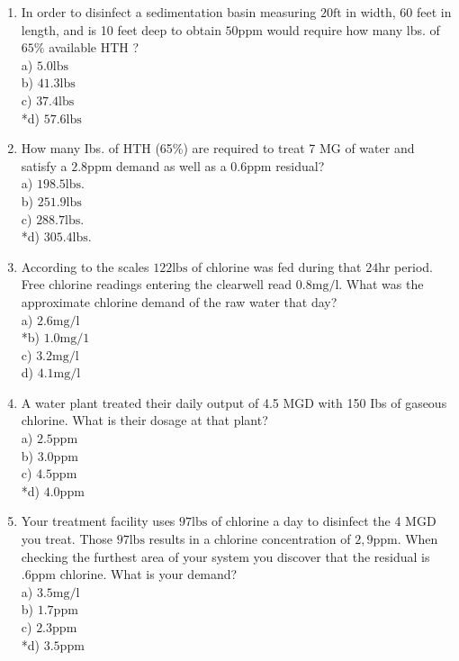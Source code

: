\documentclass{article}
\begin{document}
\begin{enumerate}

    \item In order to disinfect a sedimentation basin measuring $20 \mathrm{ft}$ in width, 60 feet in length, and is 10 feet deep to obtain $50 \mathrm{ppm}$ would require how many lbs. of $65 \%$ available $\mathrm{HTH}$ ?\\
a) $5.0 \mathrm{lbs}$\\
b) $41.3 \mathrm{lbs}$\\
c) $37.4 \mathrm{lbs}$\\
*d) $57.6 \mathrm{lbs}$\\

  \item How many Ibs. of HTH (65\%) are required to treat 7 MG of water and satisfy a $2.8 \mathrm{ppm}$ demand as well as a $0.6 \mathrm{ppm}$ residual?\\
a) $198.5 \mathrm{lbs}$.\\
b) $251.9 \mathrm{lbs}$\\
c) $288.7 \mathrm{lbs}$.\\
*d) $305.4 \mathrm{lbs}$.\\



  \item According to the scales $122 \mathrm{lbs}$ of chlorine was fed during that $24 \mathrm{hr}$ period. Free chlorine readings entering the clearwell read $0.8 \mathrm{mg} / \mathrm{l}$. What was the approximate chlorine demand of the raw water that day?\\
a) $2.6 \mathrm{mg} / \mathrm{l}$\\
*b) $1.0 \mathrm{mg} / 1$\\
c) $3.2 \mathrm{mg} / \mathrm{l}$\\
d) $4.1 \mathrm{mg} / \mathrm{l}$\\

    \item A water plant treated their daily output of 4.5 MGD with 150 Ibs of gaseous chlorine. What is their dosage at that plant?\\
a) $2.5 \mathrm{ppm}$\\
b) $3.0 \mathrm{ppm}$\\
c) $4.5 \mathrm{ppm}$\\
*d) $4.0 \mathrm{ppm}$\\

    \item Your treatment facility uses $97 \mathrm{lbs}$ of chlorine a day to disinfect the 4 MGD you treat. Those $97 \mathrm{lbs}$ results in a chlorine concentration of $2,9 \mathrm{ppm}$. When checking the furthest area of your system you discover that the residual is $.6 \mathrm{ppm}$ chlorine. What is your demand?\\
a) $3.5 \mathrm{mg} / \mathrm{l}$\\
b) $1.7 \mathrm{ppm}$\\
c) $2.3 \mathrm{ppm}$\\
*d) $3.5 \mathrm{ppm}$\\


\end{enumerate}
\end{document}
